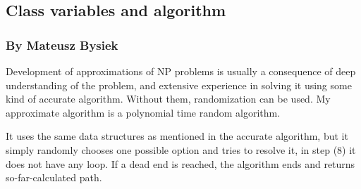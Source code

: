 \documentclass{article}
\begin{document}
\subsection{Class variables and algorithm}
\subsubsection{By Mateusz Bysiek}
Development of approximations of NP problems is usually a consequence 
of deep understanding of the problem, and extensive experience in solving it using
some kind of accurate algorithm. Without them, randomization can be used.
My approximate algorithm is a polynomial time random algorithm.

It uses the same data structures as mentioned in the accurate algorithm, but it simply randomly
chooses one possible option and tries to resolve it, in step (8) it does not have any loop.
If a dead end is reached, the algorithm ends and returns so-far-calculated path.


\end{document}

